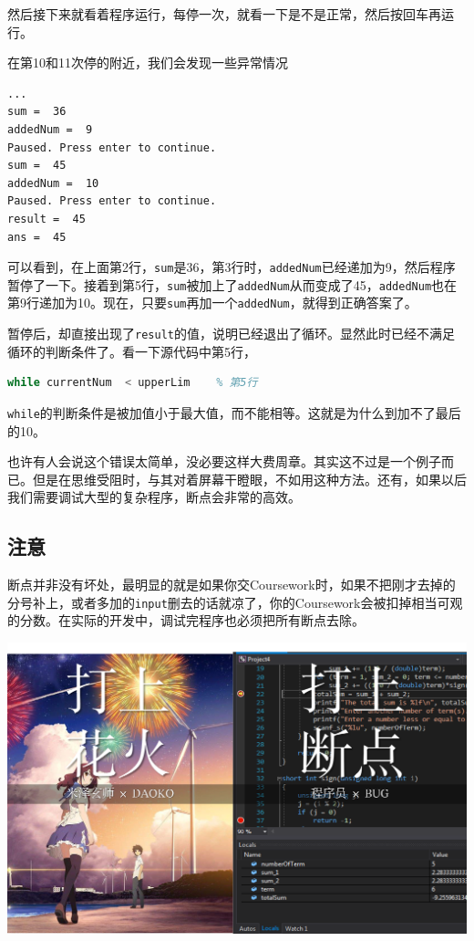 \documentclass[12pt]{article}
\begin{document}
\begin{spacing}{1.4}
然后接下来就看着程序运行，每停一次，就看一下是不是正常，然后按回车再运行。

在第10和11次停的附近，我们会发现一些异常情况

\begin{lstlisting}
...
sum =  36
addedNum =  9
Paused. Press enter to continue.
sum =  45
addedNum =  10
Paused. Press enter to continue.
result =  45
ans =  45
\end{lstlisting}

可以看到，在上面第2行，\texttt{sum}是36，第3行时，\texttt{addedNum}已经递加为9，然后程序暂停了一下。接着到第5行，\texttt{sum}被加上了\texttt{addedNum}从而变成了45，\texttt{addedNum}也在第9行递加为10。现在，只要\texttt{sum}再加一个\texttt{addedNum}，就得到正确答案了。

暂停后，却直接出现了\texttt{result}的值，说明已经退出了循环。显然此时已经不满足循环的判断条件了。看一下源代码中第5行，

\begin{lstlisting}[language=octave]
    while currentNum  < upperLim    % 第5行
\end{lstlisting}

\texttt{while}的判断条件是被加值小于最大值，而不能相等。这就是为什么到加不了最后的10。

也许有人会说这个错误太简单，没必要这样大费周章。其实这不过是一个例子而已。但是在思维受阻时，与其对着屏幕干瞪眼，不如用这种方法。还有，如果以后我们需要调试大型的复杂程序，断点会非常的高效。

\subsection{注意}

断点并非没有坏处，最明显的就是如果你交Coursework时，如果不把刚才去掉的分号补上，或者多加的\texttt{input}删去的话就凉了，你的Coursework会被扣掉相当可观的分数。在实际的开发中，调试完程序也必须把所有断点去除。

\includegraphics[width=\linewidth]{makeFirework&makeBreakPoint.png}


\end{spacing}
\end{document}
